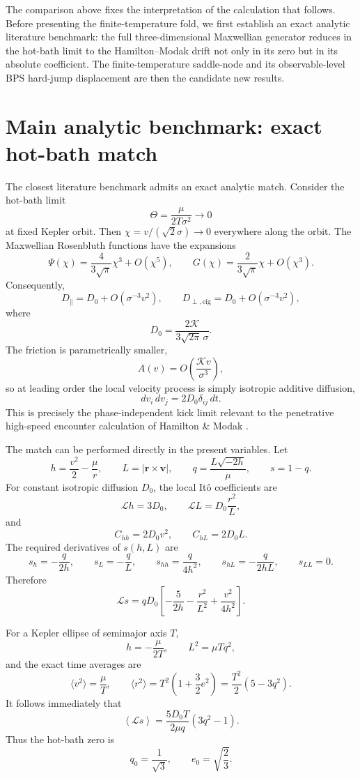 \documentclass[11pt]{article}
\theoremstyle{remark}
\newcommand{\1}{\mathbf 1}
\begin{document}
The comparison above fixes the interpretation of the calculation that follows.
Before presenting the finite-temperature fold, we first establish an exact
analytic literature benchmark: the full three-dimensional Maxwellian
generator reduces in the hot-bath limit to the Hamilton--Modak drift not only
in its zero but in its absolute coefficient.  The finite-temperature
saddle-node and its observable-level BPS hard-jump displacement are then the
candidate new results.



\section{Main analytic benchmark: exact hot-bath match}
\label{sec:hot-bath-benchmark}

The closest literature benchmark admits an exact analytic match.  Consider
the hot-bath limit
\[
\Theta=\frac{\mu}{2T\sigma^2}\longrightarrow0
\]
at fixed Kepler orbit.  Then $\chi=v/(\sqrt2\sigma)\to0$ everywhere along
the orbit.  The Maxwellian Rosenbluth functions have the expansions
\[
\Psi(\chi)
=
\frac{4}{3\sqrt\pi}\chi^3+O(\chi^5),
\qquad
G(\chi)
=
\frac{2}{3\sqrt\pi}\chi+O(\chi^3).
\]
Consequently,
\[
D_\parallel
=
D_0+O(\sigma^{-3}v^2),
\qquad
D_{\perp,\mathrm{eig}}
=
D_0+O(\sigma^{-3}v^2),
\]
where
\[
\boxed{
D_0
=
\frac{2\mathcal K}{3\sqrt{2\pi}\,\sigma}.
}
\]
The friction is parametrically smaller,
\[
A(v)=O\!\left(\frac{\mathcal K v}{\sigma^3}\right),
\]
so at leading order the local velocity process is simply isotropic additive
diffusion,
\[
d v_i\,d v_j=2D_0\delta_{ij}\,dt.
\]
This is precisely the phase-independent kick limit relevant to the
penetrative high-speed encounter calculation of Hamilton \& Modak
\cite{HamiltonModak2024}.

The match can be performed directly in the present variables.  Let
\[
h=\frac{v^2}{2}-\frac{\mu}{r},
\qquad
L=|\bm r\times\bm v|,
\qquad
q=\frac{L\sqrt{-2h}}{\mu},
\qquad
s=1-q.
\]
For constant isotropic diffusion $D_0$, the local It\^o coefficients are
\[
\mathcal L h=3D_0,
\qquad
\mathcal L L=D_0\frac{r^2}{L},
\]
and
\[
C_{hh}=2D_0v^2,
\qquad
C_{hL}=2D_0L.
\]
The required derivatives of $s(h,L)$ are
\[
s_h=-\frac{q}{2h},
\qquad
s_L=-\frac{q}{L},
\qquad
s_{hh}=\frac{q}{4h^2},
\qquad
s_{hL}=-\frac{q}{2hL},
\qquad
s_{LL}=0.
\]
Therefore
\[
\mathcal Ls
=
qD_0
\left[
-\frac{5}{2h}
-\frac{r^2}{L^2}
+\frac{v^2}{4h^2}
\right].
\]

For a Kepler ellipse of semimajor axis $T$,
\[
h=-\frac{\mu}{2T},
\qquad
L^2=\mu Tq^2,
\]
and the exact time averages are
\[
\langle v^2\rangle=\frac{\mu}{T},
\qquad
\langle r^2\rangle
=
T^2\left(1+\frac32e^2\right)
=
\frac{T^2}{2}(5-3q^2).
\]
It follows immediately that
\[
\boxed{
\left\langle\mathcal Ls\right\rangle
=
\frac{5D_0T}{2\mu q}(3q^2-1).
}
\]
Thus the hot-bath zero is
\[
\boxed{
q_0=\frac1{\sqrt3},
\qquad
e_0=\sqrt{\frac23}.
}
\]
\end{document}
